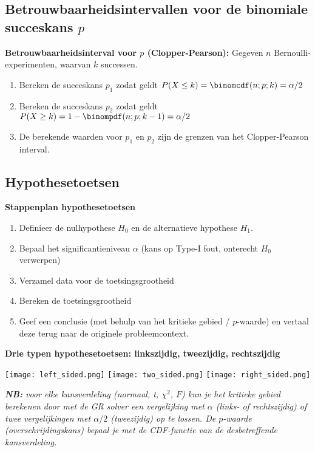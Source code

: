 \subsection*{Betrouwbaarheidsintervallen voor de binomiale succeskans $p$}
    \textbf{Betrouwbaarheidsinterval voor \boldmath$p$ (Clopper-Pearson):}
    Gegeven $n$ Bernoulli-experimenten, waarvan $k$ successen.
    \begin{enumerate}
        \item Bereken de succeskans $p_1$ zodat geldt $P(X \le k) = \binomcdf(n; p; k) = \alpha/2$
        \item Bereken de succeskans $p_2$ zodat geldt $P(X \ge k) = 1 - \binompdf(n; p; k-1) = \alpha/2$
        \item De berekende waarden voor $p_1$ en $p_2$ zijn de grenzen van het Clopper-Pearson interval.
    \end{enumerate}

\subsection*{Hypothesetoetsen}
    \textbf{Stappenplan hypothesetoetsen}
    \begin{enumerate}
        \item Definieer de nulhypothese $H_0$ en de alternatieve hypothese $H_1$.
        \item Bepaal het significantieniveau $\alpha$ (kans op Type-I fout, onterecht $H_0$ verwerpen)
        \item Verzamel data voor de toetsingsgrootheid
        \item Bereken de toetsingsgrootheid
        \item Geef een conclusie (met behulp van het kritieke gebied / $p$-waarde) en vertaal deze terug naar de originele probleemcontext.
    \end{enumerate}

    \newpage
    \textbf{Drie typen hypothesetoetsen: linkszijdig, tweezijdig, rechtszijdig}
    \begin{center}
        \texttt{[image: left\_sided.png]}
        \texttt{[image: two\_sided.png]}
        \texttt{[image: right\_sided.png]}
    \end{center}
    {\itshape \textbf{NB:} voor elke kansverdeling (normaal, t, $\chi^2$, $F$) kun je het kritieke gebied berekenen door met de GR solver een vergelijking met $\alpha$ (links- of rechtszijdig) of twee vergelijkingen met $\alpha/2$ (tweezijdig) op te lossen. De $p$-waarde (overschrijdingskans) bepaal je met de CDF-functie van de desbetreffende kansverdeling.}

